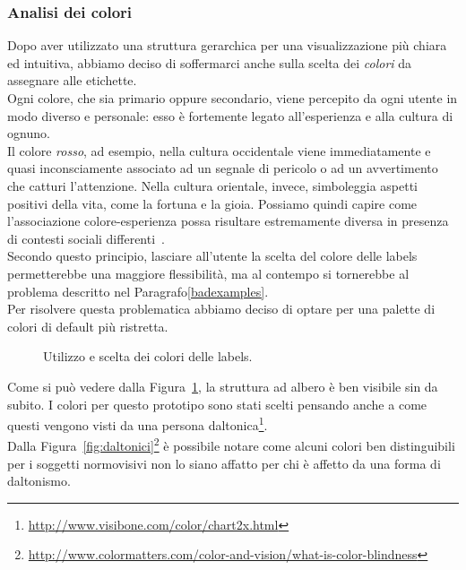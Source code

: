 \documentclass[12pt]{article} %
\begin{document}
\subsubsection{Analisi dei colori}
Dopo aver utilizzato una struttura gerarchica per una visualizzazione pi\`u chiara ed intuitiva, abbiamo deciso di soffermarci anche sulla scelta dei \emph{colori} da assegnare alle etichette.\\
Ogni colore, che sia primario oppure secondario, viene percepito da ogni utente in modo diverso e personale: esso \`e fortemente legato all'esperienza e alla cultura di ognuno.\\
Il colore \emph{rosso}, ad esempio, nella cultura occidentale viene immediatamente e quasi inconsciamente associato ad un segnale di pericolo o ad un avvertimento che catturi l'attenzione. Nella cultura orientale, invece, simboleggia aspetti positivi della vita, come la fortuna e la gioia. Possiamo quindi capire come l'associazione colore-esperienza possa risultare estremamente diversa in presenza di contesti sociali differenti~\cite[p.~9-12]{thesis}.\\
Secondo questo principio, lasciare all'utente la scelta del colore delle labels permetterebbe una maggiore flessibilit\`a, ma al contempo si tornerebbe al problema descritto nel Paragrafo\ref{badexamples}.\\
Per risolvere questa problematica abbiamo deciso di optare per una palette di colori di default pi\`u ristretta.

\begin{figure}[H]
\caption{Utilizzo e scelta dei colori delle labels.}
\label{fig:finale}
\end{figure}

Come si pu\`o vedere dalla Figura~\ref{fig:finale}, la struttura ad albero \`e ben visibile sin da subito. I colori per questo prototipo sono stati scelti pensando anche a come questi vengono visti da una persona daltonica\footnote{\url{http://www.visibone.com/color/chart2x.html}}.\\
Dalla Figura~\ref{fig:daltonici}\footnote{\url{http://www.colormatters.com/color-and-vision/what-is-color-blindness}} \`e possibile notare come alcuni colori ben distinguibili per i soggetti normovisivi non lo siano affatto per chi \`e affetto da una forma di daltonismo.
\end{document}
